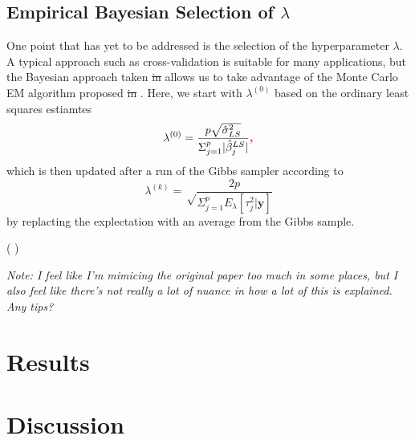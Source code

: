 \documentclass{uwstat572}
\newcommand{\vmdel}[1]{\sout{#1}}
\newcommand{\vmadd}[1]{\textbf{\color{red}{#1}}}
\newcommand{\vmcomment}[1]{({\color{blue}{VM's comment:}} \textbf{\color{blue}{#1}})}
\begin{document}
\subsection{Empirical Bayesian Selection of $\lambda$}
One point that has yet to be addressed is the selection of the hyperparameter $\lambda$.
 A typical approach such as cross-validation is suitable for many applications, but the Bayesian approach taken \vmdel{in} \vmadd{by} \cite{park2008bayesian} allows us to take advantage of the Monte Carlo EM algorithm proposed \vmdel{in} \vmadd{by} \cite{casella2001empirical}. 
 Here, we start with $\lambda^{(0)}$ based on the ordinary least squares estiamtes 
 \[ 
\lambda^{(0)}=\frac{p\sqrt{\hat\sigma^2_{LS}}}{\Sigma^p_{j=1}|\hat\beta_j^{LS}|}\vmadd{,} 
\] 
which is then updated after a run of the Gibbs sampler according to \[ 
\lambda^{(k)}=\sqrt\frac{2p}{\Sigma^p_{j=1}E_\lambda[\tau^2_j|\mathbf{y}]}
\] by replacting the explectation with an average from the Gibbs sample. 

\vmcomment{I did not understand this Monte Carlo EM at all. Where are the missing data and complete data likelihood? What is $k$ indexing? Needs a detailed explanation.} 


\emph{Note: I feel like I'm mimicing the original paper too much in some places, but I also feel like there's not really a lot of nuance in how a lot of this is explained. Any tips?}

\vmadd{I would expand on some of the derivations. For example, you probably should show how integration of $\tau$s leads to a Laplace distribution. Also, derivation of full conditionals could be helpful, at least some of them.}

\section{Results}

\section{Discussion}


\end{document}
